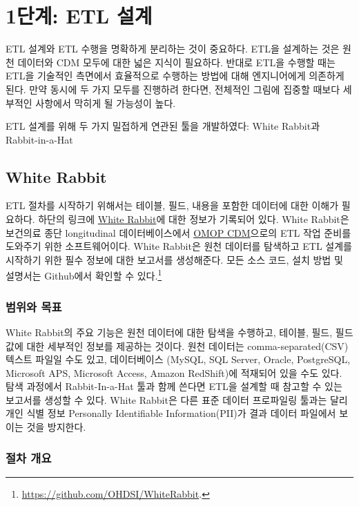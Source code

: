 \documentclass[10.5pt]{book}
\let\rmarkdownfootnote\footnote%
\def\footnote{\protect\rmarkdownfootnote}
\theoremstyle{definition}
\theoremstyle{definition}
\theoremstyle{definition}
\theoremstyle{remark}
\begin{document}
\section{1단계: ETL 설계}\label{-etl-}

ETL 설계와 ETL 수행을 명확하게 분리하는 것이 중요하다. ETL을 설계하는
것은 원천 데이터와 CDM 모두에 대한 넓은 지식이 필요하다. 반대로 ETL을
수행할 때는 ETL을 기술적인 측면에서 효율적으로 수행하는 방법에 대해
엔지니어에게 의존하게 된다. 만약 동시에 두 가지 모두를 진행하려 한다면,
전체적인 그림에 집중할 때보다 세부적인 사항에서 막히게 될 가능성이 높다.

ETL 설계를 위해 두 가지 밀접하게 연관된 툴을 개발하였다: White Rabbit과
Rabbit-in-a-Hat

\subsection{White Rabbit}\label{white-rabbit}

ETL 절차를 시작하기 위해서는 테이블, 필드, 내용을 포함한 데이터에 대한
이해가 필요하다. 하단의 링크에
\href{https://github.com/OHDSI/WhiteRabbit}{White Rabbit}에 대한 정보가
기록되어 있다. White Rabbit은 보건의료 종단 longitudinal
데이터베이스에서 \href{https://github.com/OHDSI/CommonDataModel}{OMOP
CDM}으로의 ETL 작업 준비를 도와주기 위한 소프트웨어이다. White Rabbit은
원천 데이터를 탐색하고 ETL 설계를 시작하기 위한 필수 정보에 대한
보고서를 생성해준다. 모든 소스 코드, 설치 방법 및 설명서는 Github에서
확인할 수 있다.\footnote{\url{https://github.com/OHDSI/WhiteRabbit}.}
 

\subsubsection*{범위와 목표}\label{-}

White Rabbit의 주요 기능은 원천 데이터에 대한 탐색을 수행하고, 테이블,
필드, 필드 값에 대한 세부적인 정보를 제공하는 것이다. 원천 데이터는
comma-separated(CSV) 텍스트 파일일 수도 있고, 데이터베이스 (MySQL, SQL
Server, Oracle, PostgreSQL, Microsoft APS, Microsoft Access, Amazon
RedShift)에 적재되어 있을 수도 있다. 탐색 과정에서 Rabbit-In-a-Hat 툴과
함께 쓴다면 ETL을 설계할 때 참고할 수 있는 보고서를 생성할 수 있다.
White Rabbit은 다른 표준 데이터 프로파일링 툴과는 달리 개인 식별 정보
Personally Identifiable Information(PII)가 결과 데이터 파일에서 보이는
것을 방지한다.

\subsubsection*{절차 개요}\label{-}
\end{document}
